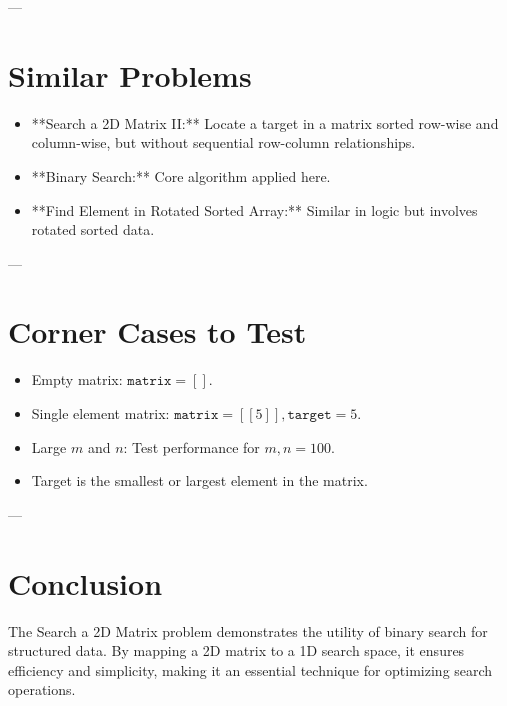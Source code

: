 ---

\section*{Similar Problems}
\begin{itemize}
    \item **Search a 2D Matrix II:** Locate a target in a matrix sorted row-wise and column-wise, but without sequential row-column relationships.
    \item **Binary Search:** Core algorithm applied here.
    \item **Find Element in Rotated Sorted Array:** Similar in logic but involves rotated sorted data.
\end{itemize}

---

\section*{Corner Cases to Test}
\begin{itemize}
    \item Empty matrix: \(\texttt{matrix} = []\).
    \item Single element matrix: \(\texttt{matrix} = [[5]], \texttt{target} = 5\).
    \item Large \(m\) and \(n\): Test performance for \(m, n = 100\).
    \item Target is the smallest or largest element in the matrix.
\end{itemize}

---

\section*{Conclusion}
The Search a 2D Matrix problem demonstrates the utility of binary search for structured data. By mapping a 2D matrix to a 1D search space, it ensures efficiency and simplicity, making it an essential technique for optimizing search operations.